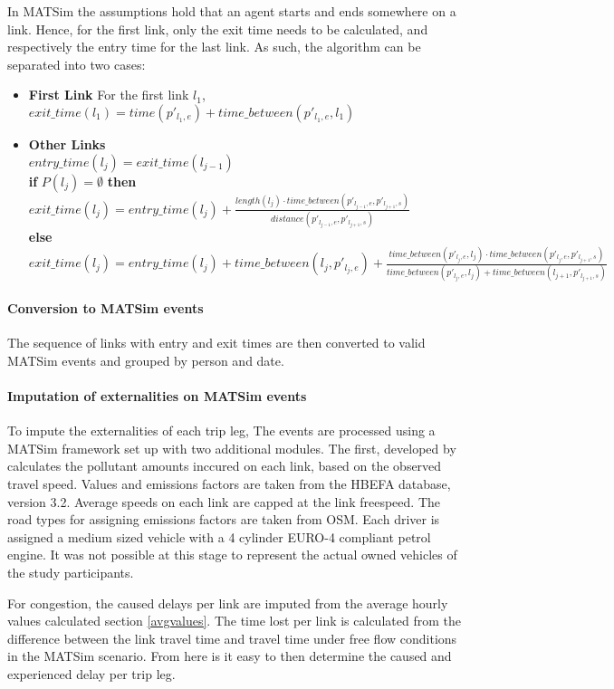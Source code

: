 In MATSim the assumptions hold that an agent starts and ends somewhere on a link. Hence, for the first link, only the exit time needs to be calculated, and respectively the entry time for the last link. As such, the algorithm can be separated into two cases:
\begin{itemize}
	\item \textbf{First Link} For the first link $l_1$, $exit\_time(l_1) = time(p'_{l_1,e}) + time\_between(p'_{l_1,e}, l_1)$
	\item \textbf{Other Links} \\
		$entry\_time(l_{j}) = exit\_time(l_{j-1}) $ \\
		\textbf{if} $P(l_j) = \emptyset$ \textbf{then} $exit\_time(l_j) = entry\_time(l_j) + 
										\frac{length(l_j) \cdot time\_between(p'_{l_{j-1},e}, p'_{l_{j+1},s})}{distance(p'_{l_{j-1},e}, p'_{l_{j+1},s})} $ \\
		\textbf{else}  $exit\_time(l_j) = entry\_time(l_j) + time\_between(l_{j}, p'_{l_j,e}) + \frac{time\_between(p'_{l_j,e}, l_{j}) \cdot time\_between(p'_{l_j,e}, p'_{l_{j+1},s})} 
					{time\_between(p'_{l_j,e}, l_{j}) + time\_between(l_{j+1},p'_{l_{j+1},s})}   $ \\
\end{itemize}

\paragraph{Conversion to MATSim events} 
The sequence of links with entry and exit times are then converted to valid MATSim events and grouped by person and date.

\paragraph{Imputation of externalities on MATSim events}
To impute the externalities of each trip leg, The events are processed using a MATSim framework set up with two additional modules. The first, developed by \citet{kaddoura} calculates the pollutant amounts inccured on each link, based on the observed travel speed. Values and emissions factors are taken from the HBEFA database, version 3.2. Average speeds on each link are capped at the link freespeed. The road types for assigning emissions factors are taken from OSM. Each driver is assigned a medium sized vehicle with a 4 cylinder EURO-4 compliant petrol engine. It was not possible at this stage to represent the actual owned vehicles of the study participants.

For congestion, the caused delays per link are imputed from the average hourly values calculated section \ref{avgvalues}. The time lost per link is calculated from the difference between the link travel time and travel time under free flow conditions in the MATSim scenario. From here is it easy to then determine the caused and experienced delay per trip leg.
